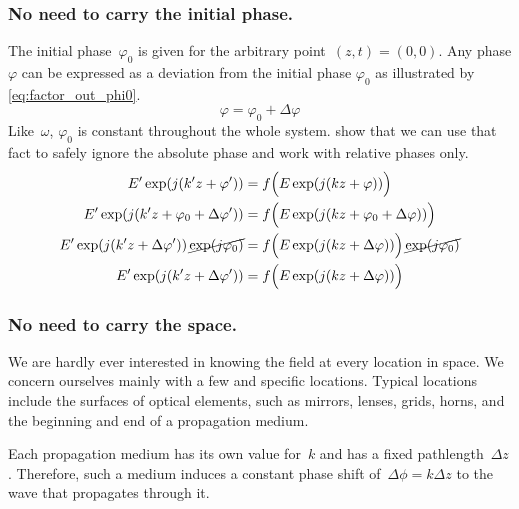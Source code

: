 \subsubsection{No need to carry the initial phase.}
The initial phase~$\varphi_0$ is given for the arbitrary point~$(z, t) = (0, 0)$.
Any phase $\varphi$ can be expressed as a deviation from the initial phase $\varphi_0$ as illustrated by \cref{eq:factor_out_phi0}.
\begin{equation}
    \varphi = \varphi_0 + \Delta \varphi
    \label{eq:factor_out_phi0}
\end{equation}
Like~$\omega$, $\varphi_0$ is constant throughout the whole system.
 show that we can use that fact to safely ignore the absolute phase and work with relative phases only.
\begin{align}
    E' \exp(j(k'z + \varphi'))
    &=
    f\Big(
        E \exp(j(kz + \varphi))
    \Big)
    \label{eq:factor_out_phi0_0}
    \\
    E' \exp(j(k'z + \varphi_0+\Delta\varphi'))
    &=
    f\Big(
        E \exp(j(kz + \varphi_0+\Delta\varphi))
    \Big)
    \label{eq:factor_out_phi0_1}
    \\
    E' \exp(j(k'z +\Delta\varphi'))
    \,\cancel{
        \exp(j\varphi_0)
    }
    &=
    f\Big(
        E \exp(j(kz+\Delta\varphi))
    \Big)
    \,\cancel{\exp(j \varphi_0)}
    \label{eq:factor_out_phi0_2}
    \\
    E' \exp(j(k'z+\Delta\varphi'))
    &=
    f\Big(
        E \exp(j(kz+\Delta\varphi))
    \Big)
    \label{eq:factor_out_phi0_3}
\end{align}

\subsubsection{No need to carry the space.}
We are hardly ever interested in knowing the field at every location in space.
We concern ourselves mainly with a few and specific locations.
Typical locations include the surfaces of optical elements, such as mirrors, lenses, grids, horns, and the beginning and end of a propagation medium.

Each propagation medium has its own value for~$k$ and has a fixed pathlength~$\Delta z$.
Therefore, such a medium induces a constant phase shift of~$\Delta\phi = k\Delta z$ to the wave that propagates through it.

